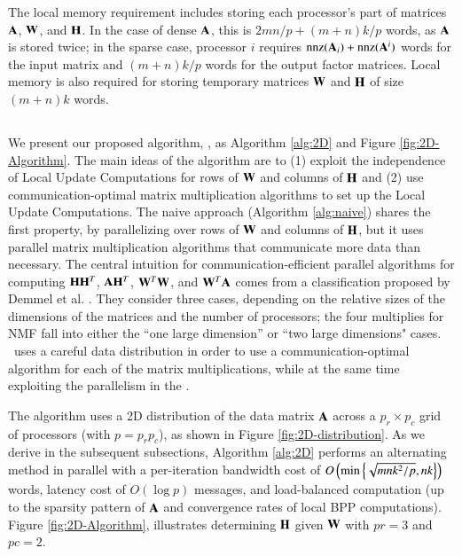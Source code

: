 The local memory requirement includes storing each processor's part of matrices $\AA$, $\WW$, and $\HH$.
In the case of dense $\AA$, this is $2mn/p+(m+n)k/p$ words, as $\AA$ is stored twice; in the sparse case, processor $i$ requires $\nnz(\AA_i)+\nnz(\AA^i)$ words for the input matrix and $(m+n)k/p$ words for the output factor matrices.
Local memory is also required for storing temporary matrices $\WW$ and $\HH$ of size $(m+n)k$ words.


\subsection{\ParNMF}
\label{sec:parNMF}

We present our proposed algorithm, \ParNMF, as Algorithm \ref{alg:2D} and Figure \ref{fig:2D-Algorithm}. 
The main ideas of the algorithm are to (1) exploit the independence of Local Update Computations for rows of $\WW$ and columns of $\HH$ and (2) use communication-optimal matrix multiplication algorithms to set up the Local Update Computations.
The naive approach (Algorithm \ref{alg:naive}) shares the first property, by parallelizing over rows of $\WW$ and columns of $\HH$, but it uses parallel matrix multiplication algorithms that communicate more data than necessary.
The central intuition for communication-efficient parallel algorithms for computing $\HH\HH^T$, $\AA\HH^T$, $\WW^T\WW$, and $\WW^T\AA$ comes from a classification proposed by Demmel et al. \cite{DE+13}.
They consider three cases, depending on the relative sizes of the dimensions of the matrices and the number of processors; the four multiplies for NMF fall into either the ``one large dimension'' or ``two large dimensions" cases.
\ParNMF\ uses a careful data distribution in order to use a communication-optimal algorithm for each of the matrix multiplications, while at the same time exploiting the parallelism in the \LUC.

The algorithm uses a 2D distribution of the data matrix $\AA$ across a $p_r \times p_c$ grid of processors (with $p=p_rp_c$), as shown in Figure \ref{fig:2D-distribution}.
As we derive in the subsequent subsections, Algorithm \ref{alg:2D} performs an alternating method in parallel with a per-iteration bandwidth cost of $O\lt(\min\lt\{\sqrt{mnk^2/p},nk\rt\}\rt)$ words, latency cost of $O(\log p)$ messages, and load-balanced computation (up to the sparsity pattern of $\AA$ and convergence rates of local BPP computations). Figure \ref{fig:2D-Algorithm}, illustrates determining $\HH$ given $\WW$ with $pr=3$ and $pc=2$. 

